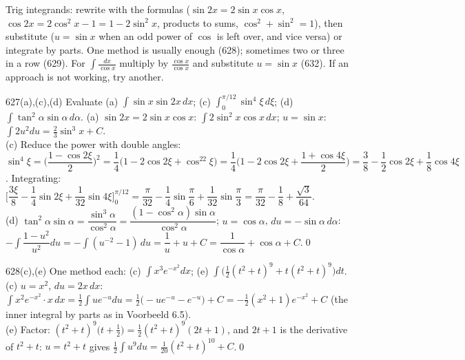 \begin{strategy}
Trig integrands: rewrite with the formulas ($\sin2x=2\sin x\cos x$, $\cos2x=2\cos^2x-1=1-2\sin^2x$, products to sums, $\cos^2+\sin^2=1$), then substitute ($u=\sin x$ when an odd power of $\cos$ is left over, and vice versa) or integrate by parts. One method is usually enough (628); sometimes two or three in a row (629). For $\int\frac{dx}{\cos x}$ multiply by $\frac{\cos x}{\cos x}$ and substitute $u=\sin x$ (632). If an approach is not working, try another.
\end{strategy}

\begin{bookex}{627(a),(c),(d)}
Evaluate (a) $\int\sin x\sin2x\,dx$; (c) $\int_0^{\pi/12}\sin^4\xi\,d\xi$; (d) $\int\tan^2\alpha\sin\alpha\,d\alpha$.
\solution
(a) $\sin2x=2\sin x\cos x$: $\int2\sin^2x\cos x\,dx$; $u=\sin x$: $\int2u^2du=\frac23\sin^3x+C$.\\
(c) Reduce the power with double angles: $\sin^4\xi=\Big(\dfrac{1-\cos2\xi}2\Big)^2=\dfrac14\big(1-2\cos2\xi+\cos^22\xi\big)=\dfrac14\Big(1-2\cos2\xi+\dfrac{1+\cos4\xi}2\Big)=\dfrac38-\dfrac12\cos2\xi+\dfrac18\cos4\xi$. Integrating: $\Big[\dfrac{3\xi}8-\dfrac14\sin2\xi+\dfrac1{32}\sin4\xi\Big]_0^{\pi/12}=\dfrac{\pi}{32}-\dfrac14\sin\dfrac\pi6+\dfrac1{32}\sin\dfrac\pi3=\dfrac\pi{32}-\dfrac18+\dfrac{\sqrt3}{64}$.\\
(d) $\tan^2\alpha\sin\alpha=\dfrac{\sin^3\alpha}{\cos^2\alpha}=\dfrac{(1-\cos^2\alpha)\sin\alpha}{\cos^2\alpha}$; $u=\cos\alpha$, $du=-\sin\alpha\,d\alpha$: $-\int\dfrac{1-u^2}{u^2}du=-\int(u^{-2}-1)\,du=\dfrac1u+u+C=\dfrac1{\cos\alpha}+\cos\alpha+C$.\qed
\end{bookex}

\begin{bookex}{628(c),(e)}
One method each: (c) $\int x^3e^{-x^2}dx$; (e) $\int\big(\tfrac12(t^2+t)^9+t(t^2+t)^9\big)dt$.
\solution
(c) $u=x^2$, $du=2x\,dx$: $\int x^2e^{-x^2}\cdot x\,dx=\frac12\int ue^{-u}du=\frac12\big(-ue^{-u}-e^{-u}\big)+C=-\frac12(x^2+1)e^{-x^2}+C$ (the inner integral by parts as in Voorbeeld 6.5).\\
(e) Factor: $(t^2+t)^9\big(t+\frac12\big)=\frac12(t^2+t)^9(2t+1)$, and $2t+1$ is the derivative of $t^2+t$: $u=t^2+t$ gives $\frac12\int u^9du=\frac1{20}(t^2+t)^{10}+C$.\qed
\end{bookex}

